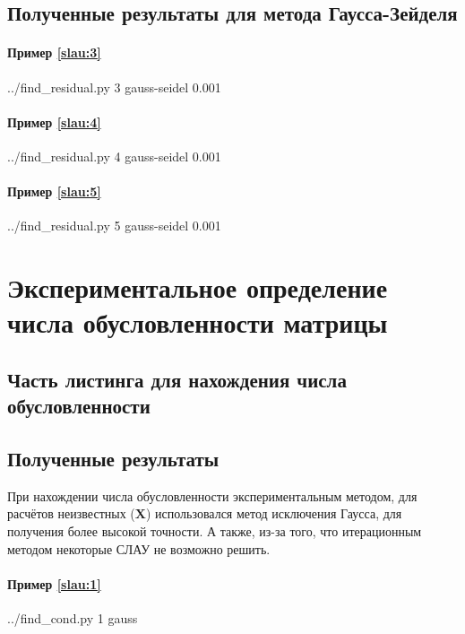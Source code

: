 \documentclass[a4paper]{article}
\newcommand{\m}[1]{\ensuremath{\bm{#1}}}
\begin{document}
\subsection{Полученные результаты для метода Гаусса-Зейделя}

\paragraph{Пример \eqref{slau:3}}
\bash[stdout]
../find_residual.py 3 gauss-seidel 0.001
\END

\paragraph{Пример \eqref{slau:4}}
\bash[stdout]
../find_residual.py 4 gauss-seidel 0.001
\END

\paragraph{Пример \eqref{slau:5}}
\bash[stdout]
../find_residual.py 5 gauss-seidel 0.001
\END

\break

\section{Экспериментальное определение числа обусловленности матрицы}

\subsection{Часть листинга для нахождения числа обусловленности}


\subsection{Полученные результаты}

При нахождении числа обусловленности экспериментальным методом, для расчётов неизвестных ($\m{X}$) использовался метод исключения Гаусса, для получения более высокой точности. А также, из-за того, что итерационным методом некоторые СЛАУ не возможно решить.

\paragraph{Пример \eqref{slau:1}}
\bash[stdout]
../find_cond.py 1 gauss
\END
\end{document}
